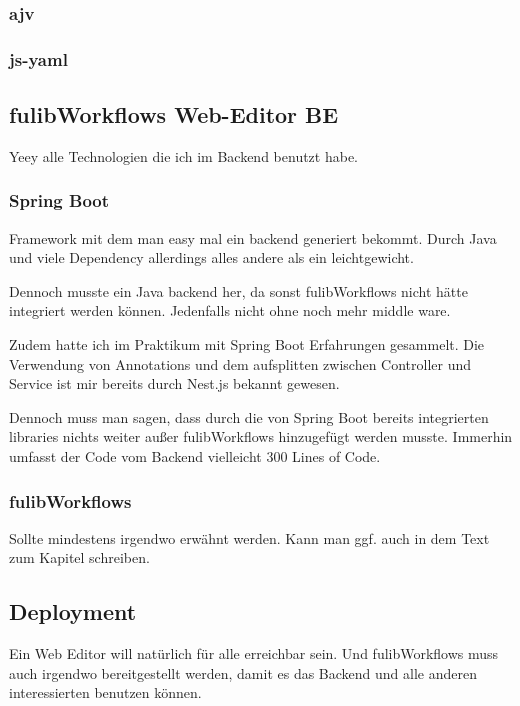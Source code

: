 \subsubsection{ajv}
\todo

\subsubsection{js-yaml}
\todo


\subsection{fulibWorkflows Web-Editor BE}\label{subsubsec:backend}
\todo
Yeey alle Technologien die ich im Backend benutzt habe.

\subsubsection{Spring Boot}
\todo
Framework mit dem man easy mal ein backend generiert bekommt.
Durch Java und viele Dependency allerdings alles andere als ein leichtgewicht.

Dennoch musste ein Java backend her, da sonst fulibWorkflows nicht hätte integriert werden können.
Jedenfalls nicht ohne noch mehr middle ware.

Zudem hatte ich im Praktikum mit Spring Boot Erfahrungen gesammelt.
Die Verwendung von Annotations und dem aufsplitten zwischen Controller und Service ist mir bereits
durch Nest.js bekannt gewesen.

Dennoch muss man sagen, dass durch die von Spring Boot bereits integrierten libraries nichts weiter
außer fulibWorkflows hinzugefügt werden musste.
Immerhin umfasst der Code vom Backend vielleicht 300 Lines of Code.

\subsubsection{fulibWorkflows}
\todo
Sollte mindestens irgendwo erwähnt werden.
Kann man ggf. auch in dem Text zum Kapitel schreiben.

\subsection{Deployment}\label{subsec:deployment}
\todo
Ein Web Editor will natürlich für alle erreichbar sein.
Und fulibWorkflows muss auch irgendwo bereitgestellt werden, damit es das Backend und alle anderen
interessierten benutzen können.


